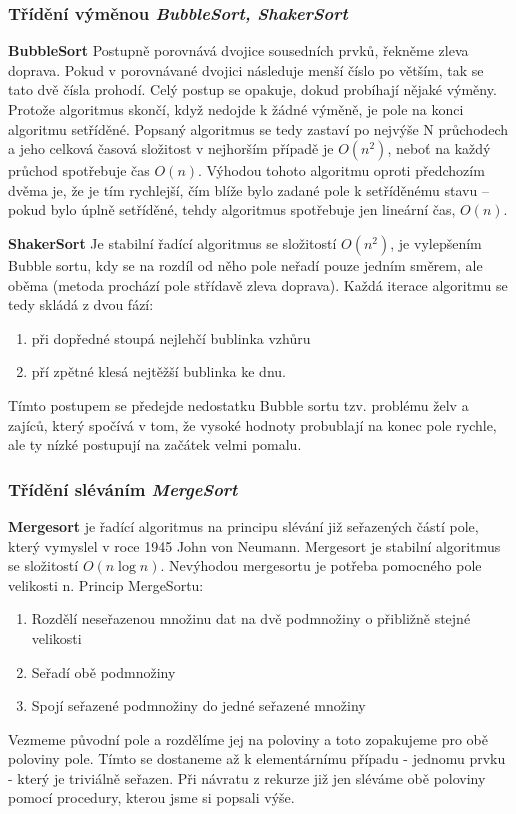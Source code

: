 \subsubsection{Třídění výměnou \textit{BubbleSort, ShakerSort}}
\textbf{BubbleSort} Postupně porovnává dvojice sousedních prvků, řekněme zleva doprava. Pokud v porovnávané dvojici následuje menší číslo po větším, tak se tato dvě čísla prohodí. Celý postup se opakuje, dokud probíhají nějaké výměny. Protože algoritmus skončí, když nedojde k žádné výměně, je pole na konci algoritmu setříděné. Popsaný algoritmus se tedy zastaví po nejvýše N průchodech a jeho celková časová složitost v nejhorším případě je $O(n^2)$, neboť na každý průchod spotřebuje čas $O(n)$.
Výhodou tohoto algoritmu oproti předchozím dvěma je, že je tím rychlejší, čím blíže bylo zadané pole k setříděnému stavu – pokud bylo úplně setříděné, tehdy algoritmus spotřebuje jen lineární čas, $O(n)$.

\textbf{ShakerSort} Je stabilní řadící algoritmus se složitostí $O(n^2)$, je vylepšením Bubble sortu, kdy se na rozdíl od něho pole neřadí pouze jedním směrem, ale oběma (metoda prochází pole střídavě zleva doprava). Každá iterace algoritmu se tedy skládá z dvou fází:
\begin{enumerate}
\item při dopředné stoupá nejlehčí bublinka vzhůru
\item pří zpětné klesá nejtěžší bublinka ke dnu.
\end{enumerate}
Tímto postupem se předejde nedostatku Bubble sortu tzv. problému želv a zajíců, který spočívá v tom, že vysoké hodnoty probublají na konec pole rychle, ale ty nízké postupují na začátek velmi pomalu.
\subsubsection{Třídění sléváním \textit{MergeSort}}
\textbf{Mergesort} je řadící algoritmus na principu slévání již seřazených částí pole, který vymyslel v roce 1945 John von Neumann. Mergesort je stabilní algoritmus se složitostí $O(n \log n)$. Nevýhodou mergesortu je potřeba pomocného pole velikosti n. Princip MergeSortu:
\begin{enumerate}
\item Rozdělí neseřazenou množinu dat na dvě podmnožiny o přibližně stejné velikosti
\item Seřadí obě podmnožiny
\item Spojí seřazené podmnožiny do jedné seřazené množiny
\end{enumerate}
Vezmeme původní pole a rozdělíme jej na poloviny a toto zopakujeme pro obě poloviny pole. Tímto se dostaneme až k elementárnímu případu - jednomu prvku - který je triviálně seřazen. Při návratu z rekurze již jen sléváme obě poloviny pomocí procedury, kterou jsme si popsali výše.

